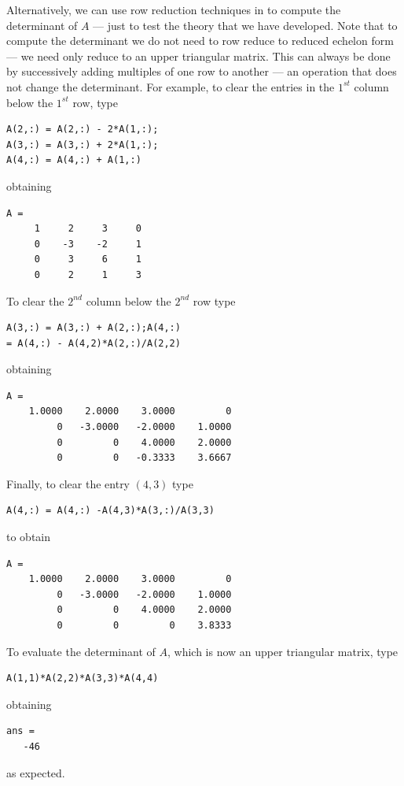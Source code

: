 \documentclass{ximera}
\begin{document}
Alternatively, we can use row reduction techniques in \Matlab to
compute the determinant of $A$ --- just to test the theory that
we have developed.  Note that to compute the determinant we do
not need to row reduce to 
reduced echelon form --- we need only
reduce to an upper triangular matrix.  This can always be done
by successively adding multiples of one row to another --- an
operation that does not change the determinant.  For example,
to clear the entries in the $1^{st}$ column below the $1^{st}$
row, type
\begin{verbatim}
A(2,:) = A(2,:) - 2*A(1,:);
A(3,:) = A(3,:) + 2*A(1,:); 
A(4,:) = A(4,:) + A(1,:)
\end{verbatim}
obtaining 
\begin{verbatim}
A =
     1     2     3     0
     0    -3    -2     1
     0     3     6     1
     0     2     1     3
\end{verbatim}
To clear the $2^{nd}$ column below the $2^{nd}$ row type 
\begin{verbatim}
A(3,:) = A(3,:) + A(2,:);A(4,:)
= A(4,:) - A(4,2)*A(2,:)/A(2,2)\end{verbatim}
obtaining
\begin{verbatim}
A =
    1.0000    2.0000    3.0000         0
         0   -3.0000   -2.0000    1.0000
         0         0    4.0000    2.0000
         0         0   -0.3333    3.6667
\end{verbatim}
Finally, to clear the entry $(4,3)$ type
\begin{verbatim}
A(4,:) = A(4,:) -A(4,3)*A(3,:)/A(3,3)\end{verbatim}
to obtain
\begin{verbatim}
A =
    1.0000    2.0000    3.0000         0
         0   -3.0000   -2.0000    1.0000
         0         0    4.0000    2.0000
         0         0         0    3.8333
\end{verbatim}
To evaluate the determinant of $A$, which is now an upper
triangular matrix, type
\begin{verbatim}
A(1,1)*A(2,2)*A(3,3)*A(4,4)\end{verbatim}
obtaining
\begin{verbatim}
ans =
   -46
\end{verbatim}
as expected.



\end{document}
